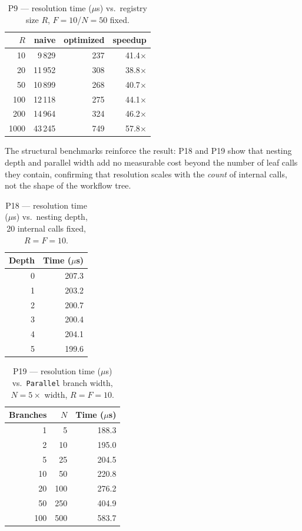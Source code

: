 \begin{table}[htbp]
  \centering
  \caption{P9 --- resolution time (\(\mu\)s) vs.\ registry size $R$, $F{=}10$/$N{=}50$ fixed.}
  \label{tab:eval-p9}
  \begin{tabular}{rrrr}
    \hline
    \textbf{$R$} & \textbf{naive} & \textbf{optimized} & \textbf{speedup} \\
    \hline
    10   & 9\,829  & 237 & 41.4$\times$ \\
    20   & 11\,952 & 308 & 38.8$\times$ \\
    50   & 10\,899 & 268 & 40.7$\times$ \\
    100  & 12\,118 & 275 & 44.1$\times$ \\
    200  & 14\,964 & 324 & 46.2$\times$ \\
    1000 & 43\,245 & 749 & 57.8$\times$ \\
    \hline
  \end{tabular}
\end{table}

The structural benchmarks reinforce the result: P18 and P19 show that nesting depth and parallel
width add no measurable cost beyond the number of leaf calls they contain, confirming that
resolution scales with the \emph{count} of internal calls, not the shape of the workflow tree.

\begin{table}[htbp]
  \centering
  \caption{P18 --- resolution time (\(\mu\)s) vs.\ nesting depth, 20 internal calls fixed,
  $R{=}F{=}10$.}
  \label{tab:eval-p18}
  \begin{tabular}{rr}
    \hline
    \textbf{Depth} & \textbf{Time (\(\mu\)s)} \\
    \hline
    0 & 207.3 \\
    1 & 203.2 \\
    2 & 200.7 \\
    3 & 200.4 \\
    4 & 204.1 \\
    5 & 199.6 \\
    \hline
  \end{tabular}
\end{table}

\begin{table}[htbp]
  \centering
  \caption{P19 --- resolution time (\(\mu\)s) vs.\ \texttt{Parallel} branch width, $N{=}5\times$
  width, $R{=}F{=}10$.}
  \label{tab:eval-p19}
  \begin{tabular}{rrr}
    \hline
    \textbf{Branches} & \textbf{$N$} & \textbf{Time (\(\mu\)s)} \\
    \hline
    1   & 5   & 188.3 \\
    2   & 10  & 195.0 \\
    5   & 25  & 204.5 \\
    10  & 50  & 220.8 \\
    20  & 100 & 276.2 \\
    50  & 250 & 404.9 \\
    100 & 500 & 583.7 \\
    \hline
  \end{tabular}
\end{table}

